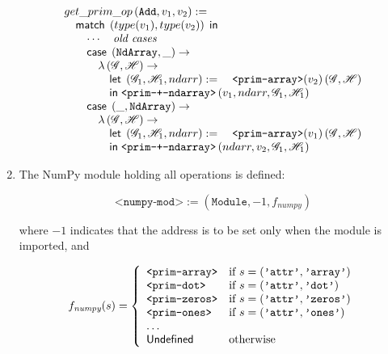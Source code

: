\begin{enumerate}
\[\arraycolsep=1.4pt
  \begin{array}[t]{l}
    get\_prim\_op\left(\texttt{Add}, v_1, v_2\right) := \\
    \quad \matchm{\left(type(v_1), type(v_2)\right)} \\
    \quad\quad \cdots \quad \textit{old cases} \\
    \quad\quad \casem{\left(\texttt{NdArray}, \_\right)} \to \\
    \quad\quad\quad \lambda \left(\Glo, \Hea\right) \rightarrow \\
    \quad\quad\qquad \letm \left(\Glo_1, \Hea_1, ndarr\right) := \quad\texttt{<prim-array>}(v_2)\left(\Glo, \Hea\right) \\
    \quad\quad\qquad \inm \texttt{<prim-+-ndarray>}\left(v_1, ndarr, \Glo_1, \Hea_1\right) \\
    \quad\quad \casem{\left(\_, \texttt{NdArray}\right)} \to \\
    \quad\quad\quad \lambda \left(\Glo, \Hea\right) \rightarrow \\
    \quad\quad\qquad \letm \left(\Glo_1, \Hea_1, ndarr\right) := \quad\texttt{<prim-array>}(v_1)\left(\Glo, \Hea\right) \\
    \quad\quad\qquad \inm \texttt{<prim-+-ndarray>}\left(ndarr, v_2, \Glo_1, \Hea_1\right) \\
  \end{array}\]


\item The NumPy module holding all operations is defined:

\[\texttt{<numpy-mod>} := \left(\texttt{Module}, -1, f_{\textit{numpy}}\right)\]

where \(-1\) indicates that the address is to be set only when the module is imported, and

\[f_{\textit{numpy}}(s) = \left\{
  \begin{array}{ll}
    \texttt{<prim-array>} & \text{if } s = \left(\texttt{'attr'}, \texttt{'array'}\right) \\
    \texttt{<prim-dot>}   & \text{if } s = \left(\texttt{'attr'}, \texttt{'dot'}\right)   \\
    \texttt{<prim-zeros>} & \text{if } s = \left(\texttt{'attr'}, \texttt{'zeros'}\right) \\
    \texttt{<prim-ones>}  & \text{if } s = \left(\texttt{'attr'}, \texttt{'ones'}\right)  \\
    \dots & \\
    \mathsf{Undefined} & \text{otherwise} \\
  \end{array}
\right.\]


\end{enumerate}
